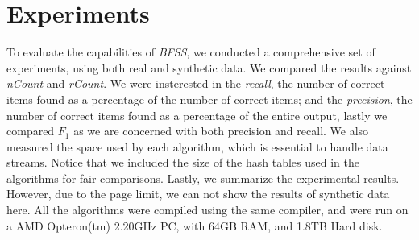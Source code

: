 \documentclass[conference]{IEEEtran}
\begin{document}
\section{Experiments}
To evaluate the capabilities of \emph{BFSS}, we conducted a comprehensive set of experiments, using both real and synthetic data. We compared the results against \emph{nCount} and \emph{rCount}. We were insterested in the \emph{recall}, the number of correct items found as a percentage of the number of correct items; and the \emph{precision}, the number of correct items found as a percentage of the entire output, lastly we compared $F_1$ as we are concerned with both precision and recall. We also measured the space used by each algorithm, which is essential to handle data streams. Notice that we included the size of the hash tables used in the algorithms for fair comparisons. Lastly, we summarize the experimental results. However, due to the page limit, we can not show the results of synthetic data here. All the algorithms were compiled using the same compiler, and were run on a AMD Opteron(tm) 2.20GHz PC, with 64GB RAM, and 1.8TB Hard disk.\par
\end{document}

